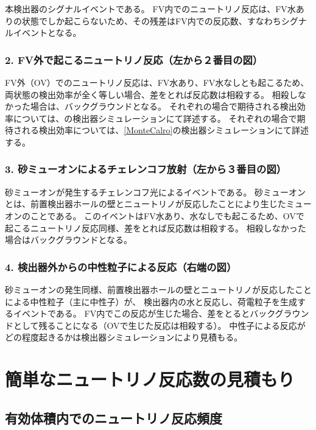 本検出器のシグナルイベントである。
FV内でのニュートリノ反応は、FV水ありの状態でしか起こらないため、その残差はFV内での反応数、すなわちシグナルイベントとなる。


\subsubsection{2. FV外で起こるニュートリノ反応（左から２番目の図）}
FV外（OV）でのニュートリノ反応は、FV水あり、FV水なしとも起こるため、
両状態の検出効率が全く等しい場合、差をとれば反応数は相殺する。
相殺しなかった場合は、バックグラウンドとなる。
それぞれの場合で期待される検出効率については、の検出器シミュレーションにて詳述する。
それぞれの場合で期待される検出効率については、\cref{MonteCalro}の検出器シミュレーションにて詳述する。

\subsubsection{3. 砂ミューオンによるチェレンコフ放射（左から３番目の図）}

砂ミューオンが発生するチェレンコフ光によるイベントである。
砂ミューオンとは、前置検出器ホールの壁とニュートリノが反応したことにより生じたミューオンのことである。
このイベントはFV水あり、水なしでも起こるため、OVで起こるニュートリノ反応同様、差をとれば反応数は相殺する。
相殺しなかった場合はバックグラウンドとなる。

\subsubsection{4. 検出器外からの中性粒子による反応（右端の図）}

砂ミューオンの発生同様、前置検出器ホールの壁とニュートリノが反応したことによる中性粒子（主に中性子）が、
検出器内の水と反応し、荷電粒子を生成するイベントである。
FV内でこの反応が生じた場合、差をとるとバックグラウンドとして残ることになる（OVで生じた反応は相殺する）。
中性子による反応がどの程度起きるかは検出器シミュレーションにより見積もる。

\section{簡単なニュートリノ反応数の見積もり}

\subsection{有効体積内でのニュートリノ反応頻度}

